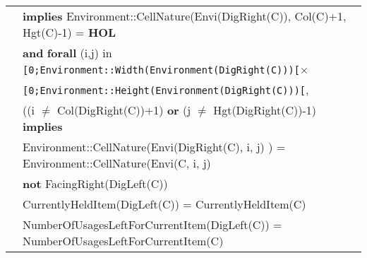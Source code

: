 \documentclass[7pt]{article}
\begin{document}
\begin{tabular}{rl}
& \quad \textbf{implies} Environment::CellNature(Envi(DigRight(C)), Col(C)+1, Hgt(C)-1) = \textbf{HOL} \\
& \quad\quad \textbf{and} {\textbf{forall}} (i,j) {in} \texttt{[0;Environment::Width(Environment(DigRight(C)))[}× \\ & \quad\quad\quad\quad\quad\quad\quad\quad\quad\quad\texttt{[0;Environment::Height(Environment(DigRight(C)))[}, \\
       & \quad\quad\quad\quad\quad\quad ((i $\neq$ Col(DigRight(C))+1) \textbf{or}  (j $\neq$ Hgt(DigRight(C))-1) \textbf{implies} \\
       & \quad\quad\quad\quad\quad\quad\quad Environment::CellNature(Envi(DigRight(C), i, j) ) = Environment::CellNature(Envi(C, i, j) \\
& \textbf{not} FacingRight(DigLeft(C)) \\
& CurrentlyHeldItem(DigLeft(C)) = CurrentlyHeldItem(C) \\
& NumberOfUsagesLeftForCurrentItem(DigLeft(C)) = NumberOfUsagesLeftForCurrentItem(C) \\

\end{tabular}
\newpage
\end{document}
